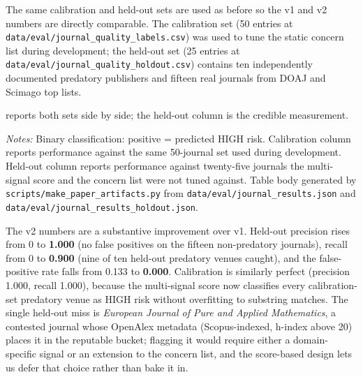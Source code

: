 \documentclass[12pt]{article}
\begin{document}
\begin{sloppypar}
The same calibration and held-out sets are used as before so the v1 and v2 numbers are directly comparable. The calibration set (50 entries at \texttt{data/eval/journal\_quality\_labels.csv}) was used to tune the static concern list during development; the held-out set (25 entries at \texttt{data/eval/journal\_quality\_holdout.csv}) contains ten independently documented predatory publishers and fifteen real journals from DOAJ and Scimago top lists.
\end{sloppypar}  reports both sets side by side; the held-out column is the credible measurement.

\begin{table}[htbp]
\centering
\caption{Phase 4 journal-quality check (v2): calibration vs held-out}
\label{tab:eval-journal-quality}
\begin{threeparttable}

\begin{tablenotes}\small
\item \textit{Notes:} Binary classification: positive = predicted HIGH risk. Calibration column reports performance against the same 50-journal set used during development. Held-out column reports performance against twenty-five journals the multi-signal score and the concern list were not tuned against. Table body generated by \texttt{scripts/make\_paper\_artifacts.py} from \texttt{data/eval/journal\_results.json} and \texttt{data/eval/journal\_results\_holdout.json}.
\end{tablenotes}
\end{threeparttable}
\end{table}

The v2 numbers are a substantive improvement over v1. Held-out precision rises from 0 to \textbf{1.000} (no false positives on the fifteen non-predatory journals), recall from 0 to \textbf{0.900} (nine of ten held-out predatory venues caught), and the false-positive rate falls from 0.133 to \textbf{0.000}. Calibration is similarly perfect (precision 1.000, recall 1.000), because the multi-signal score now classifies every calibration-set predatory venue as HIGH risk without overfitting to substring matches. The single held-out miss is \textit{European Journal of Pure and Applied Mathematics}, a contested journal whose OpenAlex metadata (Scopus-indexed, h-index above 20) places it in the reputable bucket; flagging it would require either a domain-specific signal or an extension to the concern list, and the score-based design lets us defer that choice rather than bake it in.
\end{document}

